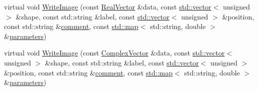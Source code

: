 \begin{DoxyCompactItemize}
\item 
virtual void \hyperlink{class_q_s_t_e_m_1_1_c_binary_output_a5adf4e3f495d92ca9ce44cf30f282013}{Write\-Image} (const \hyperlink{namespace_q_s_t_e_m_a8dfe9e1dbecce3838cb082d96e991ba7}{Real\-Vector} \&data, const \hyperlink{qmb_8m_af54b69a32590de218622e869b06b47b3}{std\-::vector}$<$ unsigned $>$ \&shape, const std\-::string \&label, const \hyperlink{qmb_8m_af54b69a32590de218622e869b06b47b3}{std\-::vector}$<$ unsigned $>$ \&position, const std\-::string \&\hyperlink{image_sim_8m_aea4cc4bd8e43a7f8ebf9b0ee3da8d681}{comment}, const \hyperlink{_displacement_params_8m_af619c74fd72bdb64d115463dff2720cd}{std\-::map}$<$ std\-::string, double $>$ \&\hyperlink{sim_image_from_wave_8m_acb6d7970e73c00effe1d16e23142f11d}{parameters})
\item 
virtual void \hyperlink{class_q_s_t_e_m_1_1_c_binary_output_a2212bc0ca38a5d07229be18d3bf559a9}{Write\-Image} (const \hyperlink{namespace_q_s_t_e_m_af210a2c1f9afae1deed746dcd9276221}{Complex\-Vector} \&data, const \hyperlink{qmb_8m_af54b69a32590de218622e869b06b47b3}{std\-::vector}$<$ unsigned $>$ \&shape, const std\-::string \&label, const \hyperlink{qmb_8m_af54b69a32590de218622e869b06b47b3}{std\-::vector}$<$ unsigned $>$ \&position, const std\-::string \&\hyperlink{image_sim_8m_aea4cc4bd8e43a7f8ebf9b0ee3da8d681}{comment}, const \hyperlink{_displacement_params_8m_af619c74fd72bdb64d115463dff2720cd}{std\-::map}$<$ std\-::string, double $>$ \&\hyperlink{sim_image_from_wave_8m_acb6d7970e73c00effe1d16e23142f11d}{parameters})
\end{DoxyCompactItemize}
